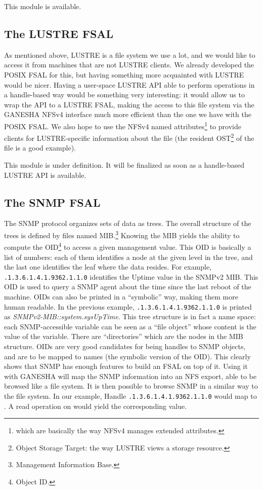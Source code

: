 \documentclass[final]{ols}
\begin{document}
This module is available.

\subsection{The LUSTRE FSAL}

As mentioned above, LUSTRE is a file system we use a lot, and we would
like to access it from machines that are not LUSTRE clients.  We
already developed the POSIX FSAL for this, but having something more
acquainted with LUSTRE would be nicer.  Having a user-space LUSTRE API
able to perform operations in a handle-based way would be something
very interesting: it would allow us to wrap the API to a LUSTRE FSAL,
making the access to this file system via the GANESHA NFSv4 interface
much more efficient than the one we have with the POSIX FSAL.  We
also hope to use the NFSv4 named attributes\footnote{which are
basically the way NFSv4 manages extended attributes.} to provide
clients for LUSTRE-specific information about the file (the resident
OST\footnote{Object Storage Target: the way LUSTRE views a storage
resource.} of the file is a good example).

This module is under definition. It will be finalized as soon as a
handle-based LUSTRE API is available.

\subsection{The SNMP FSAL}

The SNMP protocol organizes sets of data as trees. The overall
structure of the trees is defined by files named
MIB.\footnote{Management Information Base.}  Knowing the MIB yields
the ability to 
compute the OID\footnote{Object ID.} to access a given management
value. This OID is basically a list of numbers: each of them
identifies a node at the given level in the tree, and the last one
identifies the leaf where the data resides. For example,
\texttt{.1.3.6.1.4.1.9362.1.1.0} identifies the Uptime value in the SNMPv2 MIB.
This OID is used to query a SNMP agent about the time since the last
reboot of the machine. OIDs can also be printed in a ``symbolic'' way,
making them more human readable.  In the previous example,
\texttt{.1.3.6.1.4.1.9362.1.1.0} is printed as 
\textit{SNMPv2-MIB::system.sysUpTime}.  This tree structure is in fact a
name space: each SNMP-accessible variable can be seen as a ``file
object'' whose content is the value of the variable. There are
``directories'' which are the nodes in the MIB structure. OIDs are very
good candidates for being handles to SNMP objects, and are to be mapped
to names (the symbolic version of the OID). This clearly shows that
SNMP has enough features to build an FSAL on top of it. Using it with
GANESHA will map the SNMP information into an NFS export, able to be
browsed like a file system.  It is then possible to browse SNMP in a
similar way to the  file system. In our example, Handle
\texttt{.1.3.6.1.4.1.9362.1.1.0} would map to .  A read operation on
 would yield the corresponding value.
\end{document}
